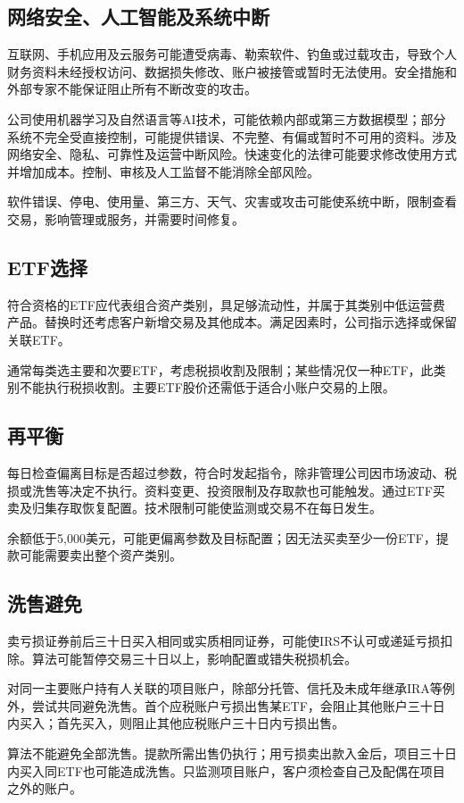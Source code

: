 \documentclass[UTF8,fontset=none,11pt,a4paper]{ctexart}
\begin{document}
\subsection*{网络安全、人工智能及系统中断}
互联网、手机应用及云服务可能遭受病毒、勒索软件、钓鱼或过载攻击，导致个人财务资料未经授权访问、数据损失修改、账户被接管或暂时无法使用。安全措施和外部专家不能保证阻止所有不断改变的攻击。


公司使用机器学习及自然语言等AI技术，可能依赖内部或第三方数据模型；部分系统不完全受直接控制，可能提供错误、不完整、有偏或暂时不可用的资料。涉及网络安全、隐私、可靠性及运营中断风险。快速变化的法律可能要求修改使用方式并增加成本。控制、审核及人工监督不能消除全部风险。


软件错误、停电、使用量、第三方、天气、灾害或攻击可能使系统中断，限制查看交易，影响管理或服务，并需要时间修复。


\subsection*{ETF选择}
符合资格的ETF应代表组合资产类别，具足够流动性，并属于其类别中低运营费产品。替换时还考虑客户新增交易及其他成本。满足因素时，公司指示选择或保留关联ETF。


通常每类选主要和次要ETF，考虑税损收割及限制；某些情况仅一种ETF，此类别不能执行税损收割。主要ETF股价还需低于适合小账户交易的上限。


\subsection*{再平衡}
每日检查偏离目标是否超过参数，符合时发起指令，除非管理公司因市场波动、税损或洗售等决定不执行。资料变更、投资限制及存取款也可能触发。通过ETF买卖及归集存取恢复配置。技术限制可能使监测或交易不在每日发生。


余额低于5,000美元，可能更偏离参数及目标配置；因无法买卖至少一份ETF，提款可能需要卖出整个资产类别。


\subsection*{洗售避免}
卖亏损证券前后三十日买入相同或实质相同证券，可能使IRS不认可或递延亏损扣除。算法可能暂停交易三十日以上，影响配置或错失税损机会。


对同一主要账户持有人关联的项目账户，除部分托管、信托及未成年继承IRA等例外，尝试共同避免洗售。首个应税账户亏损出售某ETF，会阻止其他账户三十日内买入；首先买入，则阻止其他应税账户三十日内亏损出售。


算法不能避免全部洗售。提款所需出售仍执行；用亏损卖出款入金后，项目三十日内买入同ETF也可能造成洗售。只监测项目账户，客户须检查自己及配偶在项目之外的账户。
\end{document}
